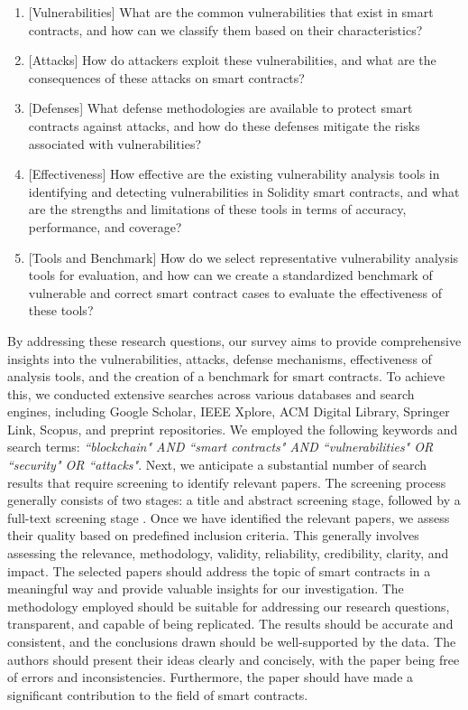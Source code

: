 \documentclass[manuscript,screen]{acmart}
\begin{document}
\begin{enumerate}[RQ 1:]
  \item {[Vulnerabilities]} What are the common vulnerabilities that exist in smart contracts, and how can we classify them based on their characteristics?
  \item {[Attacks]} How do attackers exploit these vulnerabilities, and what are the consequences of these attacks on smart contracts?
  \item {[Defenses]} What defense methodologies are available to protect smart contracts against attacks, and how do these defenses mitigate the risks associated with vulnerabilities?
  \item {[Effectiveness]} How effective are the existing vulnerability analysis tools in identifying and detecting vulnerabilities in Solidity smart contracts, and what are the strengths and limitations of these tools in terms of accuracy, performance, and coverage?
  \item {[Tools and Benchmark]} How do we select representative vulnerability analysis tools for evaluation, and how can we create a standardized benchmark of vulnerable and correct smart contract cases to evaluate the effectiveness of these tools?
\end{enumerate}

By addressing these research questions, our survey aims to provide comprehensive insights into the vulnerabilities, attacks, defense mechanisms, effectiveness of analysis tools, and the creation of a benchmark for smart contracts. To achieve this, we conducted extensive searches across various databases and search engines, including Google Scholar, IEEE Xplore, ACM Digital Library, Springer Link, Scopus, and preprint repositories. We employed the following keywords and search terms: \textit{``blockchain" AND ``smart contracts" AND ``vulnerabilities" OR ``security" OR ``attacks"}.
Next, we anticipate a substantial number of search results that require screening to identify relevant papers. The screening process generally consists of two stages: a title and abstract screening stage, followed by a full-text screening stage \cite{polanin2019best}. Once we have identified the relevant papers, we assess their quality based on predefined inclusion criteria. 
This generally involves assessing the relevance, methodology, validity, reliability, credibility, clarity, and impact. The selected papers should address the topic of smart contracts in a meaningful way and provide valuable insights for our investigation. The methodology employed should be suitable for addressing our research questions, transparent, and capable of being replicated. The results should be accurate and consistent, and the conclusions drawn should be well-supported by the data. The authors should present their ideas clearly and concisely, with the paper being free of errors and inconsistencies. Furthermore, the paper should have made a significant contribution to the field of smart contracts.
\end{document}
